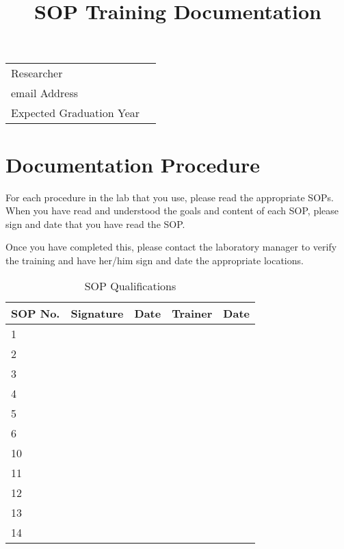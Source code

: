 \documentclass{article}
\title{SOP Training Documentation}
\begin{document}


\maketitle

\begin{table}[h]
		\begin{tabular}{p{5cm}p{6cm}}
Researcher      &  \\
email Address   & \\
Expected Graduation Year & \\
		\end{tabular}
\end{table}


\section{Documentation Procedure}

For each procedure in the lab that you use, please read the appropriate SOPs. When you have read and understood the goals and content of each SOP, please sign and date that you have read the SOP. 

Once you have completed this, please contact the laboratory manager to verify the training and have her/him sign and date the appropriate locations.

\begin{table}[h]
	\caption{SOP Qualifications}
	\label{tab:CommonObjects}
		\begin{tabular}{|l|p{3cm}|p{2cm}|p{3cm}|p{2cm}|}\hline
SOP No. & Signature & Date  & Trainer & Date \\
\hline
1  & & & & \\ \hline
2  & & & & \\ \hline
3  & & & & \\ \hline
4  & & & & \\ \hline
5  & & & & \\ \hline
6  & & & & \\ \hline
10  & & & & \\ \hline
11  & & & & \\ \hline
12  & & & & \\ \hline
13  & & & & \\ \hline
14  & & & & \\ \hline
		\end{tabular}

\end{table}
\end{document}
